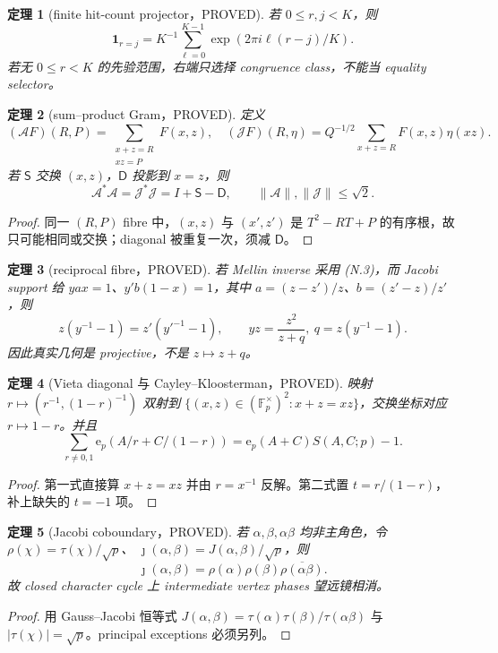 \documentclass[11pt,a4paper]{ctexart}
\newtheorem{theorem}{定理}[section]
\theoremstyle{definition}
\newcommand{\e}{\mathrm e}
\newcommand{\1}{\mathbf 1}
\newcommand{\F}{\mathbb F}
\newcommand{\G}{\F_p^\times}
\newcommand{\PROVED}{\textcolor{green!40!black}{\textsf{PROVED}}}
\begin{document}
\begin{theorem}[finite hit-count projector，\PROVED]
若 $0\le r,j<K$，则
\[
 \1_{r=j}=K^{-1}\sum_{\ell=0}^{K-1}\exp(2\pi i\ell(r-j)/K).\tag{TK.1}
\]
若无 $0\le r<K$ 的先验范围，右端只选择 congruence class，不能当 equality selector。
\end{theorem}

\begin{theorem}[sum--product Gram，\PROVED]
定义
\[
 (\mathcal AF)(R,P)=\sum_{\substack{x+z=R\\xz=P}}F(x,z),\quad
 (\mathcal JF)(R,\eta)=Q^{-1/2}\sum_{x+z=R}F(x,z)\eta(xz).
\]
若 $\mathsf S$ 交换 $(x,z)$，$\mathsf D$ 投影到 $x=z$，则
\[
 \boxed{\mathcal A^*\mathcal A=\mathcal J^*\mathcal J
 =I+\mathsf S-\mathsf D},\qquad
 \|\mathcal A\|,\|\mathcal J\|\le\sqrt2.          \tag{TK.2}
\]
\end{theorem}
\begin{proof}
同一 $(R,P)$ fibre 中，$(x,z)$ 与 $(x',z')$ 是
$T^2-RT+P$ 的有序根，故只可能相同或交换；diagonal 被重复一次，须减 $\mathsf D$。
\end{proof}

\begin{theorem}[reciprocal fibre，\PROVED]
若 Mellin inverse 采用 (N.3)，而 Jacobi support 给
$yax=1$、$y'b(1-x)=1$，其中
$a=(z-z')/z$、$b=(z'-z)/z'$，则
\[
 z(y^{-1}-1)=z'(y'^{-1}-1),\qquad
 yz=\frac{z^2}{z+q},\ q=z(y^{-1}-1).                 \tag{TK.3}
\]
因此真实几何是 projective，不是 $z\mapsto z+q$。
\end{theorem}

\begin{theorem}[Vieta diagonal 与 Cayley--Kloosterman，\PROVED]
映射 $r\mapsto(r^{-1},(1-r)^{-1})$ 双射到
$\{(x,z)\in(\G)^2:x+z=xz\}$，交换坐标对应 $r\mapsto1-r$。并且
\[
 \sum_{r\ne0,1}\e_p(A/r+C/(1-r))
 =\e_p(A+C)S(A,C;p)-1.                               \tag{TK.4}
\]
\end{theorem}
\begin{proof}
第一式直接算 $x+z=xz$ 并由 $r=x^{-1}$ 反解。第二式置
$t=r/(1-r)$，补上缺失的 $t=-1$ 项。
\end{proof}

\begin{theorem}[Jacobi coboundary，\PROVED]
若 $\alpha,\beta,\alpha\beta$ 均非主角色，令
$\rho(\chi)=\tau(\chi)/\sqrt p$、
$\jmath(\alpha,\beta)=J(\alpha,\beta)/\sqrt p$，则
\[
 \jmath(\alpha,\beta)=\rho(\alpha)\rho(\beta)
 \overline{\rho(\alpha\beta)}.                     \tag{TK.5}
\]
故 closed character cycle 上 intermediate vertex phases 望远镜相消。
\end{theorem}
\begin{proof}
用 Gauss--Jacobi 恒等式
$J(\alpha,\beta)=\tau(\alpha)\tau(\beta)/\tau(\alpha\beta)$ 与
$|\tau(\chi)|=\sqrt p$。principal exceptions 必须另列。
\end{proof}
\end{document}
